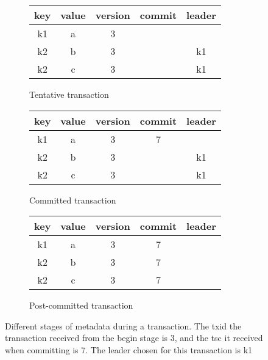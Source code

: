 \begin{figure}[!t]
  \centering
  
  \begin{subfigure}[t]{\columnwidth}
      \centering
    \begin{tabular}{|c|c|c|c|c|}
      \hline
      key & value & version & commit& leader\\
      \hline
      \hline
      k1 & a & 3 & &\\
      \hline
      k2 & b & 3 & &k1\\
      \hline
      k2 & c & 3 & &k1\\
      \hline
    \end{tabular}
	\caption[]{Tentative transaction}
    \label{fig:model:tentative}
  \end{subfigure}
  
  \begin{subfigure}[t]{\columnwidth}
    \centering
    \begin{tabular}{|c|c|c|c|c|}
      \hline
      key & value & version & commit& leader\\
      \hline
      \hline
      k1 & a & 3 & 7&\\
      \hline
      k2 & b & 3 & &k1\\
      \hline
      k2 & c & 3 & &k1\\
      \hline
    \end{tabular}
	\caption[]{Committed transaction}
    \label{fig:model:committed}
  \end{subfigure}


  \begin{subfigure}[t]{\columnwidth}
    \centering
    \begin{tabular}{|c|c|c|c|c|}
      \hline
      key & value & version & commit& leader\\
      \hline
      \hline
      k1 & a & 3 & 7&\\
      \hline
      k2 & b & 3 & 7&\\
      \hline
      k2 & c & 3 & 7&\\
      \hline
    \end{tabular}
	\caption[]{Post-committed transaction}
    \label{fig:model:postcommit}
  \end{subfigure}

  
  \caption{Different stages of metadata during a transaction. The txid the transaction received from the begin stage is 3, and the tsc it received when committing is 7. The leader chosen for this transaction is k1 }
  \label{fig:model}
\end{figure}


